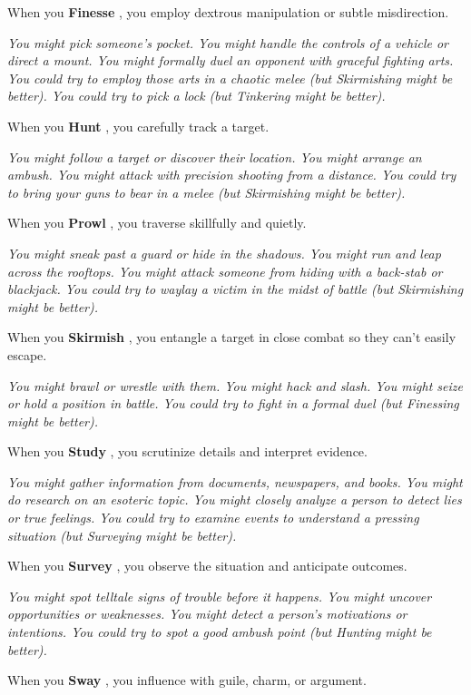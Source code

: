 \documentclass[11pt,oneside]{book}
\newcommand{\gameterm}[1]{\textbf{#1}}
\begin{document}
When you \gameterm{Finesse} , you employ dextrous manipulation or subtle misdirection.

\emph{You might pick someone’s pocket. You might handle the controls of a vehicle or direct a mount. You might formally duel an opponent with graceful fighting arts. You could try to employ those arts in a chaotic melee (but Skirmishing might be better). You could try to pick a lock (but Tinkering might be better).}

When you \gameterm{Hunt} , you carefully track a target.

\emph{You might follow a target or discover their location. You might arrange an ambush. You might attack with precision shooting from a distance. You could try to bring your guns to bear in a melee (but Skirmishing might be better).}

When you \gameterm{Prowl} , you traverse skillfully and quietly.

\emph{You might sneak past a guard or hide in the shadows. You might run and leap across the rooftops. You might attack someone from hiding with a back-stab or blackjack. You could try to waylay a victim in the midst of battle (but Skirmishing might be better).}

When you \gameterm{Skirmish} , you entangle a target in close combat so they can’t easily escape.

\emph{You might brawl or wrestle with them. You might hack and slash. You might seize or hold a position in battle. You could try to fight in a formal duel (but Finessing might be better).}

When you \gameterm{Study} , you scrutinize details and interpret evidence.

\emph{You might gather information from documents, newspapers, and books. You might do research on an esoteric topic. You might closely analyze a person to detect lies or true feelings. You could try to examine events to understand a pressing situation (but Surveying might be better).}

When you \gameterm{Survey} , you observe the situation and anticipate outcomes.

\emph{You might spot telltale signs of trouble before it happens. You might uncover opportunities or weaknesses. You might detect a person’s motivations or intentions. You could try to spot a good ambush point (but Hunting might be better).}

When you \gameterm{Sway} , you influence with guile, charm, or argument.
\end{document}
